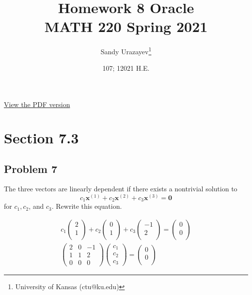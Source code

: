 \documentclass[12pt]{article}
\author{Sandy Urazayev\thanks{University of Kansas (ctu@ku.edu)}}
\date{107; 12021 H.E.}
\title{Homework 8 Oracle\\\medskip
\large MATH 220 Spring 2021}
\begin{document}
\maketitle
\href{./index.pdf}{View the PDF version​}

\section*{Section 7.3}
\label{sec:orgae56529}
\subsection*{Problem 7}
\label{sec:orgc2376a2}
   The three vectors are linearly dependent if there exists a nontrivial solution to
$$
c_{1} \mathbf{x}^{(1)}+c_{2} \mathbf{x}^{(2)}+c_{3} \mathbf{x}^{(3)}=\mathbf{0}
$$
for \(c_{1}, c_{2}\), and \(c_{3}\). Rewrite this equation.

\begin{equation*}
	\begin{array}{l}
		c_{1}\left(\begin{array}{l}
				2 \\
				1 \\

			\end{array}\right)+c_{2}\left(\begin{array}{l}
				0 \\
				1 \\

			\end{array}\right)+c_{3}\left(\begin{array}{r}
				-1 \\
				2  \\

			\end{array}\right)=\left(\begin{array}{l}
				0 \\
				0 \\

			\end{array}\right) \\
		\left(\begin{array}{llr}
				2 & 0 & -1 \\
				1 & 1 & 2  \\
				0 & 0 & 0
			\end{array}\right)\left(\begin{array}{l}
				c_{1} \\
				c_{2} \\
				c_{3}
			\end{array}\right)=\left(\begin{array}{l}
				0 \\
				0 \\

			\end{array}\right)
	\end{array}
\end{equation*}
\end{document}

